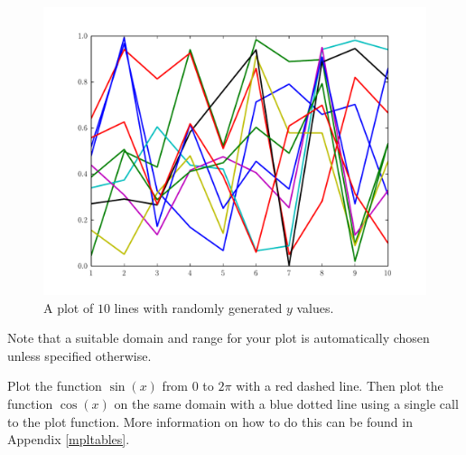 \begin{figure}
\includegraphics[width=\textwidth]{statemachine.pdf}
\caption{A plot of $10$ lines with randomly generated $y$ values.}
\label{fig:statemachine} 
\end{figure}

Note that a suitable domain and range for your plot is automatically chosen 
unless specified otherwise. 

\begin{problem} Plot the function $\sin(x)$ from $0$ to $2\pi$ with a red dashed line. Then plot the function $\cos(x)$ on the same domain with a blue dotted line using a single call to the plot function. More information on how to do this can be found in Appendix \ref{mpltables}. 
\end{problem}



